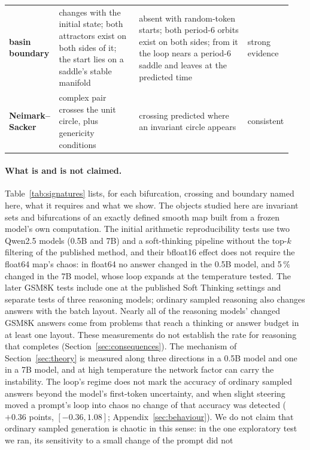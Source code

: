 \documentclass[11pt,letterpaper]{article}
\begin{document}
\begin{table}[tbp]
\begin{tabular}{@{}p{0.15\linewidth}p{0.29\linewidth}p{0.38\linewidth}p{0.12\linewidth}@{}}
\raggedright \textbf{basin boundary} & \raggedright changes with the initial state; both attractors exist on both sides of it; the start lies on a saddle's
stable manifold & \raggedright absent with random-token starts; both period-6 orbits exist on both sides; from it the loop nears a
period-6 saddle and leaves at the predicted time & \raggedright strong evidence \tabularnewline
\raggedright \textbf{Neimark--Sacker} & \raggedright complex pair crosses the unit circle, plus genericity conditions & \raggedright crossing predicted where an invariant circle appears & \raggedright consistent \tabularnewline
\bottomrule
\end{tabular}
\end{table}

\paragraph{What is and is not claimed.} Table~\ref{tab:signatures} lists, for each bifurcation, crossing and
boundary named here, what it requires and what we show. The objects studied here are invariant sets and bifurcations of an exactly
defined smooth map built from a frozen model's own computation. The initial arithmetic reproducibility tests use two Qwen2.5
models (0.5B and 7B) and a soft-thinking pipeline without the top-$k$ filtering of the published
method, and their bfloat16 effect does not require the float64 map's chaos: in float64 no answer changed in the 0.5B
model, and 5\,\% changed in the 7B model, whose loop expands at the temperature tested.
The later GSM8K tests include one at the published Soft Thinking settings and separate tests of three reasoning models; ordinary sampled
reasoning also changes answers with the batch layout. Nearly all of the reasoning models' changed GSM8K answers come
from problems that reach a thinking or answer budget in at least one layout. These measurements do not establish
the rate for reasoning that completes (Section~\ref{sec:consequences}). The mechanism of
Section~\ref{sec:theory} is measured along three directions in a 0.5B model and one in a 7B model, and at high
temperature the network factor can carry the instability. The loop's regime does not mark the accuracy of ordinary
sampled answers beyond the model's first-token uncertainty, and when slight steering moved a prompt's loop into chaos no change of that accuracy was detected ($+0.36$ points,
$[-0.36,1.08]$; Appendix~\ref{sec:behaviour}). We do not claim that ordinary sampled generation is
chaotic in this sense: in the one exploratory test we ran, its sensitivity to a small change of the prompt did not
\end{document}
